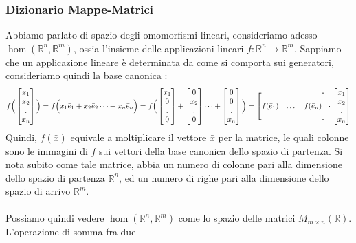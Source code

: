 \documentclass[12pt, letterpaper]{article}
\newcommand{\R}{{\mathbb R}}
\newcommand{\acc}{\\\hphantom{}\\}
\begin{document}
 \subsubsection{Dizionario Mappe-Matrici}
Abbiamo parlato di spazio degli omomorfismi lineari, consideriamo adesso \(\hom(\R^n,\R^m)\), ossia l'insieme 
delle applicazioni lineari \(f:\R^n\rightarrow \R^m\). Sappiamo che un applicazione lineare è determinata da come si comporta 
sui generatori, consideriamo quindi la base canonica : $$
f\Big(\begin{bmatrix}
    x_1\\x_2\\.\\x_n
\end{bmatrix}\Big)=f\Big(x_1\bar e_1+x_2\bar e_2\dots+x_n\bar e_n\Big)
=f\Big(\begin{bmatrix}
    x_1\\0\\.\\0
\end{bmatrix}+\begin{bmatrix}
    0\\x_2\\.\\0
\end{bmatrix}\dots +\begin{bmatrix}
    0\\0\\.\\x_n
\end{bmatrix}\Big)
=\begin{bmatrix}             
    \hphantom{}&\hphantom{}&\hphantom{}\\
    f(\bar e_1)&\dots&f(\bar e_n)\\
    \hphantom{}&\hphantom{}&\hphantom{}
\end{bmatrix}\cdot \begin{bmatrix}
    x_1\\x_2\\.\\x_n
\end{bmatrix}$$
Quindi, \(f(\bar x)\) equivale a moltiplicare il vettore \(\bar x\) per la matrice, le quali colonne 
sono le immagini di \(f\) sui vettori della base canonica dello spazio di partenza. Si nota subito come 
tale matrice, abbia un numero di colonne pari alla dimensione dello spazio di partenza \(\R^n\), ed un numero 
di righe pari alla dimensione dello spazio di arrivo \(\R^m\). \acc Possiamo quindi vedere 
\(\hom(\R^n,\R^m)\) come lo spazio delle matrici \(M_{m\times n}(\R)\). L'operazione di somma fra due 
\end{document}

